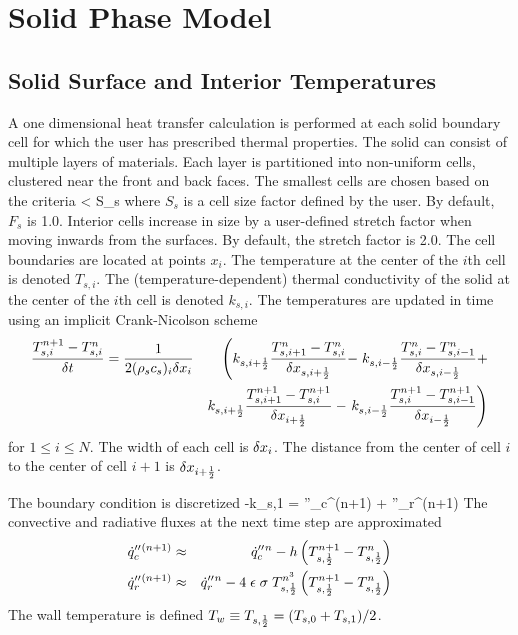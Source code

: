 \documentclass[11pt]{book}
\begin{document}
\clearpage
\section{Solid Phase Model}

\subsection{Solid Surface and Interior Temperatures}

A one dimensional heat transfer calculation is performed at each solid
boundary cell for which the user has prescribed thermal
properties. The solid can consist of multiple layers of materials.
Each layer is partitioned into non-uniform cells, clustered near the
front and back faces.  The smallest cells are chosen based on the
criteria
\be \dx < S_s \ee
where $S_s$ is a cell size factor defined by the user. By default,
$F_s$ is 1.0.  Interior cells increase in size by a user-defined
stretch factor when moving inwards from the surfaces. By default, the
stretch factor is 2.0. The cell boundaries are located at points
$x_i$. The temperature at the center of the $i$th cell is denoted $T_{s,i}$.
The (temperature-dependent) thermal conductivity of the solid
at the center of the $i$th cell is denoted $k_{s,i}$.
The temperatures are updated in time using an implicit
Crank-Nicolson scheme
\begin{eqnarray}
    \frac{T_{s,i}^{n+1}-T_{s,i}^n}{\delta t} = \frac{1}{2 (\rho_s c_s)_i \delta x_{i} }
& & \left(
    k_{s,i+\frac{1}{2}}\frac{T_{s,i+1}^n-T_{s,i}^n}{\delta x_{s,i+\frac{1}{2}}} - \right.
    k_{s,i-\frac{1}{2}}\frac{T_{s,i}^n-T_{s,i-1}^n}{\delta x_{s,i-\frac{1}{2}}} +  \nonumber \\
& & k_{s,i+\frac{1}{2}}\frac{T_{s,i+1}^{n+1}-T_{s,i}^{n+1}}{\delta x_{i+\frac{1}{2}}} -
    \left.
    k_{s,i-\frac{1}{2}}\frac{T_{s,i}^{n+1}-T_{s,i-1}^{n+1}}{\delta x_{i-\frac{1}{2}}}
     \right) \end{eqnarray}
for $1 \le i \le N$.
The width of each cell is $\delta x_i$. The distance from the center of cell $i$ to the center
of cell $i+1$ is $\delta x_{i+\frac{1}{2}}$.

The boundary condition is discretized
\be -k_{s,1}  = \dq''_c{}^{(n+1)} + \dq''_r{}^{(n+1)} \ee
The convective and radiative fluxes at the next time step are approximated
\begin{eqnarray}
\dot{q}''_c{}^{(n+1)} &\approx& \dot{q}''_c{}^n - h\left( T_{s,\frac{1}{2}}^{n+1} - T_{s,\frac{1}{2}}^n \right) \\
\dot{q}''_r{}^{(n+1)} &\approx& \dot{q}''_r{}^n - 4 \; \epsilon \; \sigma \; T_{s,\frac{1}{2}}^{n^3} \left(
  T_{s,\frac{1}{2}}^{n+1} - T_{s,\frac{1}{2}}^n \right)  \end{eqnarray}
The wall temperature is defined $T_w \equiv T_{s,\frac{1}{2}}=(T_{s,0}+T_{s,1})/2$.
\end{document}
